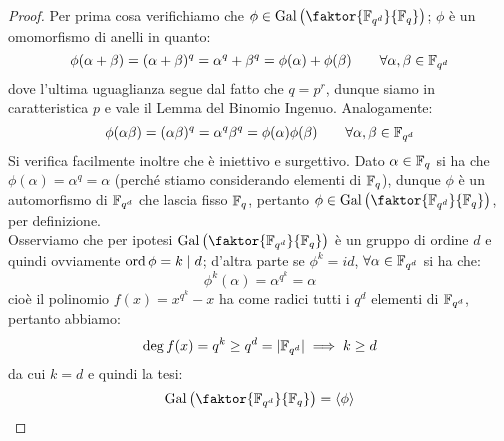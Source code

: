 \documentclass[11pt]{scrartcl}
\begin{document}
\begin{proof}
    Per prima cosa verifichiamo che $\phi \in \Gal\left(\faktor{\F{q^d}}{\F{q}}\right)$; $\phi$ è un omomorfismo di anelli in quanto:
    \[ \phi(\alpha+\beta) = (\alpha+\beta)^q = \alpha^q + \beta^q = \phi(\alpha) + \phi(\beta) \qquad \forall \alpha,\beta \in \mathbb{F}_{q^d} 
        \]
    dove l'ultima uguaglianza segue dal fatto che $q = p^r$, dunque siamo in caratteristica $p$ e vale il Lemma del Binomio Ingenuo. Analogamente:
    \[ \phi(\alpha\beta) = (\alpha\beta)^q = \alpha^q \beta^q = \phi(\alpha)\phi(\beta) \qquad \forall \alpha,\beta \in \mathbb{F}_{q^d} 
        \]
    Si verifica facilmente inoltre che è iniettivo e surgettivo. 
    Dato $\alpha \in \mathbb{F}_{q}$ si ha che $\phi(\alpha) = \alpha^q = \alpha$ (perché stiamo considerando elementi di $\mathbb{F}_{q}$), 
    dunque $\phi$ è un automorfismo di $\mathbb{F}_{q^d}$ che lascia fisso $\mathbb{F}_{q}$, pertanto $\phi \in \Gal\left(\faktor{\F{q^d}}{\F{q}}\right)$, per definizione. \\
    Osserviamo che per ipotesi $\Gal\left(\faktor{\F{q^d}}{\F{q}}\right)$ è un gruppo di ordine $d$ e quindi 
    ovviamente $\operatorname{ord} \phi = k \mid d$; d'altra parte se $\phi^k = id$, $\forall \alpha \in \mathbb{F}_{q^d}$ si ha che:
    \[ \phi^k(\alpha) = \alpha^{q^k} = \alpha
        \]
    cioè il polinomio $f(x) = x^{q^k} - x$ ha come radici tutti i $q^d$ elementi di $\mathbb{F}_{q^d}$, pertanto abbiamo:
    \[ \deg f(x) = q^k \geq q^d = |\mathbb{F}_{q^d}|\implies k \geq d
        \]
    da cui $k = d$ e quindi la tesi:
    \[ \Gal\left(\faktor{\F{q^d}}{\F{q}}\right) = \left<\phi\right>
        \]
\end{proof}
\end{document}
